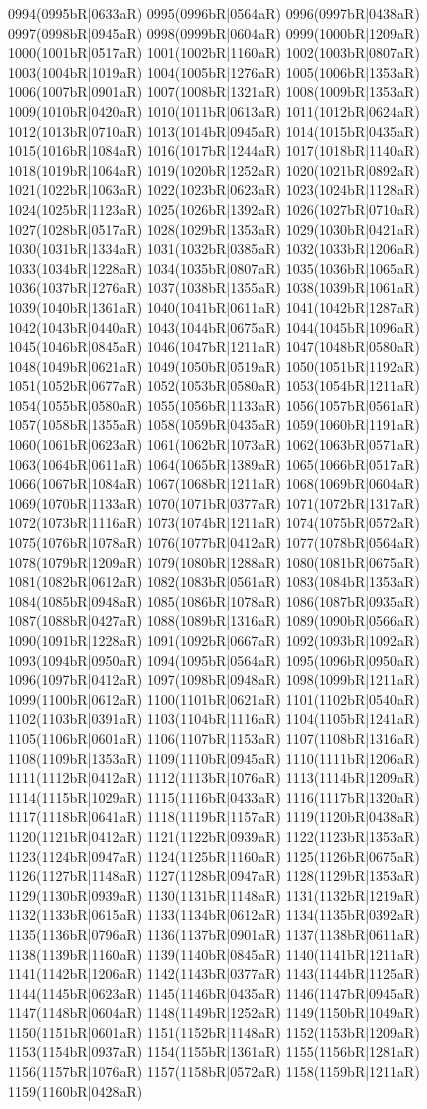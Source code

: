 0994(0995bR|0633aR) 0995(0996bR|0564aR) 0996(0997bR|0438aR) 0997(0998bR|0945aR) 0998(0999bR|0604aR) 0999(1000bR|1209aR) 1000(1001bR|0517aR) 1001(1002bR|1160aR) 1002(1003bR|0807aR) 1003(1004bR|1019aR) 1004(1005bR|1276aR) 1005(1006bR|1353aR) 1006(1007bR|0901aR) 1007(1008bR|1321aR) 1008(1009bR|1353aR) 1009(1010bR|0420aR) 1010(1011bR|0613aR) 1011(1012bR|0624aR) 1012(1013bR|0710aR) 1013(1014bR|0945aR) 1014(1015bR|0435aR) 1015(1016bR|1084aR) 1016(1017bR|1244aR) 1017(1018bR|1140aR) 1018(1019bR|1064aR) 1019(1020bR|1252aR) 1020(1021bR|0892aR) 1021(1022bR|1063aR) 1022(1023bR|0623aR) 1023(1024bR|1128aR) 1024(1025bR|1123aR) 1025(1026bR|1392aR) 1026(1027bR|0710aR) 1027(1028bR|0517aR) 1028(1029bR|1353aR) 1029(1030bR|0421aR) 1030(1031bR|1334aR) 1031(1032bR|0385aR) 1032(1033bR|1206aR) 1033(1034bR|1228aR) 1034(1035bR|0807aR) 1035(1036bR|1065aR) 1036(1037bR|1276aR) 1037(1038bR|1355aR) 1038(1039bR|1061aR) 1039(1040bR|1361aR) 1040(1041bR|0611aR) 1041(1042bR|1287aR) 1042(1043bR|0440aR) 1043(1044bR|0675aR) 1044(1045bR|1096aR) 1045(1046bR|0845aR) 1046(1047bR|1211aR) 1047(1048bR|0580aR) 1048(1049bR|0621aR) 1049(1050bR|0519aR) 1050(1051bR|1192aR) 1051(1052bR|0677aR) 1052(1053bR|0580aR) 1053(1054bR|1211aR) 1054(1055bR|0580aR) 1055(1056bR|1133aR) 1056(1057bR|0561aR) 1057(1058bR|1355aR) 1058(1059bR|0435aR) 1059(1060bR|1191aR) 1060(1061bR|0623aR) 1061(1062bR|1073aR) 1062(1063bR|0571aR) 1063(1064bR|0611aR) 1064(1065bR|1389aR) 1065(1066bR|0517aR) 1066(1067bR|1084aR) 1067(1068bR|1211aR) 1068(1069bR|0604aR) 1069(1070bR|1133aR) 1070(1071bR|0377aR) 1071(1072bR|1317aR) 1072(1073bR|1116aR) 1073(1074bR|1211aR) 1074(1075bR|0572aR) 1075(1076bR|1078aR) 1076(1077bR|0412aR) 1077(1078bR|0564aR) 1078(1079bR|1209aR) 1079(1080bR|1288aR) 1080(1081bR|0675aR) 1081(1082bR|0612aR) 1082(1083bR|0561aR) 1083(1084bR|1353aR) 1084(1085bR|0948aR) 1085(1086bR|1078aR) 1086(1087bR|0935aR) 1087(1088bR|0427aR) 1088(1089bR|1316aR) 1089(1090bR|0566aR) 1090(1091bR|1228aR) 1091(1092bR|0667aR) 1092(1093bR|1092aR) 1093(1094bR|0950aR) 1094(1095bR|0564aR) 1095(1096bR|0950aR) 1096(1097bR|0412aR) 1097(1098bR|0948aR) 1098(1099bR|1211aR) 1099(1100bR|0612aR) 1100(1101bR|0621aR) 1101(1102bR|0540aR) 1102(1103bR|0391aR) 1103(1104bR|1116aR) 1104(1105bR|1241aR) 1105(1106bR|0601aR) 1106(1107bR|1153aR) 1107(1108bR|1316aR) 1108(1109bR|1353aR) 1109(1110bR|0945aR) 1110(1111bR|1206aR) 1111(1112bR|0412aR) 1112(1113bR|1076aR) 1113(1114bR|1209aR) 1114(1115bR|1029aR) 1115(1116bR|0433aR) 1116(1117bR|1320aR) 1117(1118bR|0641aR) 1118(1119bR|1157aR) 1119(1120bR|0438aR) 1120(1121bR|0412aR) 1121(1122bR|0939aR) 1122(1123bR|1353aR) 1123(1124bR|0947aR) 1124(1125bR|1160aR) 1125(1126bR|0675aR) 1126(1127bR|1148aR) 1127(1128bR|0947aR) 1128(1129bR|1353aR) 1129(1130bR|0939aR) 1130(1131bR|1148aR) 1131(1132bR|1219aR) 1132(1133bR|0615aR) 1133(1134bR|0612aR) 1134(1135bR|0392aR) 1135(1136bR|0796aR) 1136(1137bR|0901aR) 1137(1138bR|0611aR) 1138(1139bR|1160aR) 1139(1140bR|0845aR) 1140(1141bR|1211aR) 1141(1142bR|1206aR) 1142(1143bR|0377aR) 1143(1144bR|1125aR) 1144(1145bR|0623aR) 1145(1146bR|0435aR) 1146(1147bR|0945aR) 1147(1148bR|0604aR) 1148(1149bR|1252aR) 1149(1150bR|1049aR) 1150(1151bR|0601aR) 1151(1152bR|1148aR) 1152(1153bR|1209aR) 1153(1154bR|0937aR) 1154(1155bR|1361aR) 1155(1156bR|1281aR) 1156(1157bR|1076aR) 1157(1158bR|0572aR) 1158(1159bR|1211aR) 1159(1160bR|0428aR) 